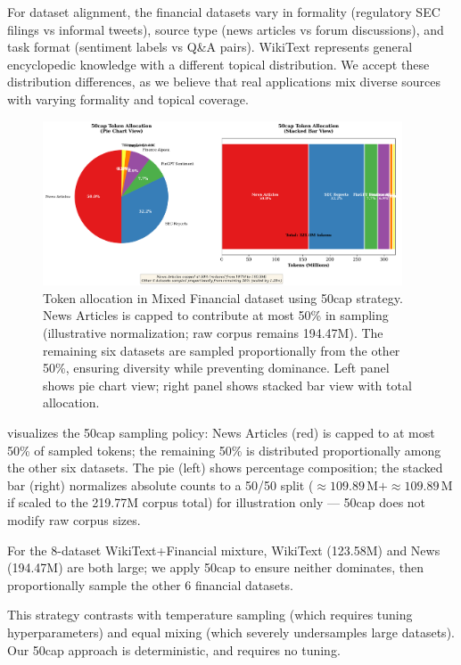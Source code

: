 For dataset alignment, the financial datasets vary in formality (regulatory SEC filings vs informal tweets), source type (news articles vs forum discussions), and task format (sentiment labels vs Q\&A pairs). WikiText represents general encyclopedic knowledge with a different topical distribution. We accept these distribution differences, as we believe that real applications mix diverse sources with varying formality and topical coverage.

\begin{figure}[htbp]
\centering
\includegraphics[width=0.95\textwidth]{figures/diagram_50cap.png}
\caption[50cap Mixture Strategy Visualization]{Token allocation in Mixed Financial dataset using 50cap strategy. News Articles is capped to contribute at most 50\% in sampling (illustrative normalization; raw corpus remains 194.47M). The remaining six datasets are sampled proportionally from the other 50\%, ensuring diversity while preventing dominance. Left panel shows pie chart view; right panel shows stacked bar view with total allocation.}
\label{fig:diagram_50cap}
\end{figure}

 visualizes the 50cap sampling policy: News Articles (red) is capped to at most 50\% of sampled tokens; the remaining 50\% is distributed proportionally among the other six datasets. The pie (left) shows percentage composition; the stacked bar (right) normalizes absolute counts to a 50/50 split (\(\approx\!109.89\,\text{M}+\approx\!109.89\,\text{M}\) if scaled to the 219.77M corpus total) for illustration only — 50cap does not modify raw corpus sizes.

For the 8-dataset WikiText+Financial mixture, WikiText (123.58M) and News (194.47M) are both large; we apply 50cap to ensure neither dominates, then proportionally sample the other 6 financial datasets.

This strategy contrasts with temperature sampling (which requires tuning hyperparameters) and equal mixing (which severely undersamples large datasets). Our 50cap approach is deterministic, and requires no tuning.


